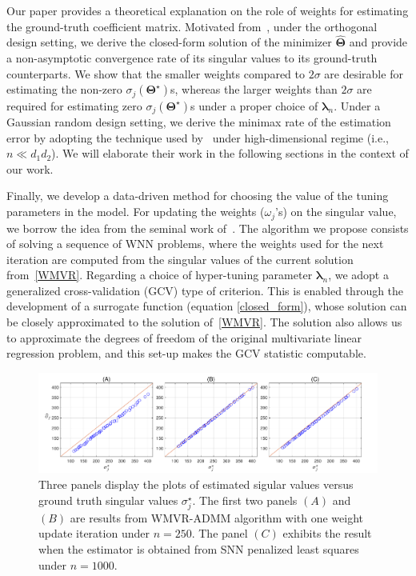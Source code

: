 \documentclass[alpha-refs]{wiley-article}
\begin{document}
Our paper provides a theoretical explanation on the role of weights for estimating the ground-truth coefficient matrix.
Motivated from~\citet{yuan2007dimension}, under the orthogonal design setting, we derive the closed-form solution of the minimizer $\widehat{\boldsymbol{\Theta}}$ and provide a non-asymptotic convergence rate of its singular values to its ground-truth counterparts.
We show that the smaller weights compared to $2\sigma$ are desirable for estimating the non-zero $\sigma_{j}(\boldsymbol{\Theta}^{\star})$s, whereas the larger weights than $2\sigma$ are required for estimating zero $\sigma_{j}(\boldsymbol{\Theta}^{\star})$s under a proper choice of $\boldsymbol{\lambda}_{n}$.
Under a Gaussian random design setting, we derive the minimax rate of the estimation error by adopting the technique used by~\citet{negahban2011estimation} under high-dimensional regime (i.e., $n \ll d_{1}d_{2}$).
We will elaborate their work in the following sections in the context of our work.

Finally, we develop a data-driven method for choosing the value of the tuning parameters in the model.
For updating the weights ($\omega_{j}$'s) on the singular value, we borrow the idea from the seminal work of~\citet{candes2008enhancing}.
The algorithm we propose consists of solving a sequence of WNN problems, where the weights used for the next iteration are computed from the singular values of the current solution from~\eqref{WMVR}.
Regarding a choice of hyper-tuning parameter $\boldsymbol{\lambda}_{n}$, we adopt a generalized cross-validation (GCV) type of criterion.
This is enabled through the development of a surrogate function (equation \eqref{closed_form}), whose solution can be closely approximated to the solution of~\eqref{WMVR}. The solution also allows us to approximate the degrees of freedom of the original multivariate linear regression problem,  and this set-up makes the GCV statistic computable.

\begin{figure}
  \includegraphics[width=150mm]{Figure/Fig1.pdf}
  \centering
  \caption{Three panels display the plots of estimated sigular values versus ground truth singular values $\sigma^{\star}_{j}$.
  The first two panels $(A)$ and $(B)$ are results from WMVR-ADMM algorithm with one weight update iteration under $n=250$.
  The panel $(C)$ exhibits the result when the estimator is obtained from SNN penalized least squares under $n=1000$. }
  \label{Fig1}
\end{figure}
\end{document}
